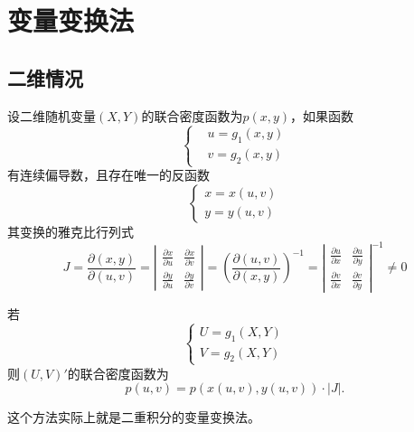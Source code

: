 \section{变量变换法}
\subsection{二维情况}
设二维随机变量$(X,Y)$的联合密度函数为$p(x,y)$，如果函数
$$\left\{\begin{aligned}
&u=g_{1}(x, y) \\
&v=g_{2}(x, y)
\end{aligned}\right.$$
有连续偏导数，且存在唯一的反函数
$$\left\{\begin{aligned}
x=x(u, v) \\
y=y(u, v)
\end{aligned}\right.$$
其变换的雅克比行列式
$$J=\frac{\partial(x, y)}{\partial(u, v)}=\left|\begin{array}{ll}
\frac{\partial x}{\partial u} & \frac{\partial x}{\partial v} \\
\frac{\partial y}{\partial u} & \frac{\partial y}{\partial v}
\end{array}\right|=\left(\frac{\partial(u, v)}{\partial(x, y)}\right)^{-1}=\left|\begin{array}{ll}
\frac{\partial u}{\partial x} & \frac{\partial u}{\partial y} \\
\frac{\partial v}{\partial x} & \frac{\partial v}{\partial y}
\end{array}\right|^{-1} \neq 0$$

若$$\left\{\begin{array}{l}
U=g_{1}(X, Y) \\
V=g_{2}(X, Y)
\end{array}\right.$$
则$(U,V)'$的联合密度函数为
$$p(u, v)=p(x(u, v), y(u, v)) \cdot|J|.$$
\begin{remark}
    这个方法实际上就是二重积分的变量变换法。
\end{remark}

